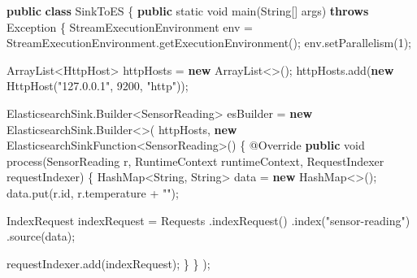 \documentclass[cn,11pt,chinese]{elegantbook}
\newenvironment{Shaded}{}{}
\newcommand{\AttributeTok}[1]{\textcolor[rgb]{0.49,0.56,0.16}{#1}}
\newcommand{\BuiltInTok}[1]{#1}
\newcommand{\DataTypeTok}[1]{\textcolor[rgb]{0.56,0.13,0.00}{#1}}
\newcommand{\DecValTok}[1]{\textcolor[rgb]{0.25,0.63,0.44}{#1}}
\newcommand{\FunctionTok}[1]{\textcolor[rgb]{0.02,0.16,0.49}{#1}}
\newcommand{\KeywordTok}[1]{\textcolor[rgb]{0.00,0.44,0.13}{\textbf{#1}}}
\newcommand{\NormalTok}[1]{#1}
\newcommand{\StringTok}[1]{\textcolor[rgb]{0.25,0.44,0.63}{#1}}
\begin{document}
\begin{Shaded}
\begin{Highlighting}[]
\KeywordTok{public} \KeywordTok{class}\NormalTok{ SinkToES \{}
    \KeywordTok{public} \DataTypeTok{static} \DataTypeTok{void} \FunctionTok{main}\NormalTok{(}\BuiltInTok{String}\NormalTok{[] args) }\KeywordTok{throws} \BuiltInTok{Exception}\NormalTok{ \{}
\NormalTok{        StreamExecutionEnvironment env = StreamExecutionEnvironment.}\FunctionTok{getExecutionEnvironment}\NormalTok{();}
\NormalTok{        env.}\FunctionTok{setParallelism}\NormalTok{(}\DecValTok{1}\NormalTok{);}

        \BuiltInTok{ArrayList}\NormalTok{\textless{}HttpHost\textgreater{} httpHosts = }\KeywordTok{new} \BuiltInTok{ArrayList}\NormalTok{\textless{}\textgreater{}();}
\NormalTok{        httpHosts.}\FunctionTok{add}\NormalTok{(}\KeywordTok{new} \FunctionTok{HttpHost}\NormalTok{(}\StringTok{"127.0.0.1"}\NormalTok{, }\DecValTok{9200}\NormalTok{, }\StringTok{"http"}\NormalTok{));}

\NormalTok{        ElasticsearchSink.}\FunctionTok{Builder}\NormalTok{\textless{}SensorReading\textgreater{} esBuilder = }\KeywordTok{new}\NormalTok{ ElasticsearchSink.}\FunctionTok{Builder}\NormalTok{\textless{}\textgreater{}(}
\NormalTok{            httpHosts,}
            \KeywordTok{new}\NormalTok{ ElasticsearchSinkFunction\textless{}SensorReading\textgreater{}() \{}
                \AttributeTok{@Override}
                \KeywordTok{public} \DataTypeTok{void} \FunctionTok{process}\NormalTok{(SensorReading r, RuntimeContext runtimeContext, RequestIndexer requestIndexer) \{}
                    \BuiltInTok{HashMap}\NormalTok{\textless{}}\BuiltInTok{String}\NormalTok{, }\BuiltInTok{String}\NormalTok{\textgreater{} data = }\KeywordTok{new} \BuiltInTok{HashMap}\NormalTok{\textless{}\textgreater{}();}
\NormalTok{                    data.}\FunctionTok{put}\NormalTok{(r.}\FunctionTok{id}\NormalTok{, r.}\FunctionTok{temperature}\NormalTok{ + }\StringTok{""}\NormalTok{);}

\NormalTok{                    IndexRequest indexRequest = Requests}
\NormalTok{                            .}\FunctionTok{indexRequest}\NormalTok{()}
\NormalTok{                            .}\FunctionTok{index}\NormalTok{(}\StringTok{"sensor{-}reading"}\NormalTok{)}
\NormalTok{                            .}\FunctionTok{source}\NormalTok{(data);}

\NormalTok{                    requestIndexer.}\FunctionTok{add}\NormalTok{(indexRequest);}
\NormalTok{                \}}
\NormalTok{            \}}
\NormalTok{        );}


\end{Highlighting}
\end{Shaded}
\end{document}
